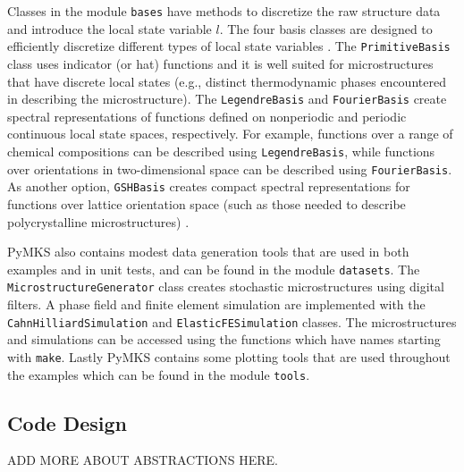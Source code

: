 \documentclass{bmcart}
\begin{document}
Classes in the module \texttt{bases} have methods to discretize the raw structure data and introduce the local state variable $l$. The four basis classes are designed to efficiently discretize different types of local state variables \cite{landi2010multi, kalidindi2010novel, yabansu2014calibrated, al2012multi, kalidindi2011microstructure, gupta2015structure,  cceccen2014data, brough2016microstructure}. The \texttt{PrimitiveBasis} class uses indicator (or hat) functions and it is well suited for microstructures that have discrete local states (e.g., distinct thermodynamic phases encountered in describing the microstructure). The \texttt{LegendreBasis} and \texttt{FourierBasis} create spectral representations of functions defined on nonperiodic and periodic continuous local state spaces, respectively. For example, functions over a range of chemical compositions can be described using \texttt{LegendreBasis}, while functions over orientations in two-dimensional space can be described using \texttt{FourierBasis}. As another option, \texttt{GSHBasis} creates compact spectral representations for functions over lattice orientation space (such as those needed to describe polycrystalline microstructures) \cite{ kalidindi2006spectral, shaffer2010building, knezevic2010deformation, al2010spectral, duvvuru2007application, li2003evolution, li2005texture, li2007processing, li2005processing, creuziger2014crystallographic, sundararaghavan2008multi, sundararaghavan2007linear}.

PyMKS also contains modest data generation tools that are used in both examples and in unit tests, and can be found in the module \texttt{datasets}. The \texttt{MicrostructureGenerator} class creates stochastic microstructures using digital filters. A phase field and finite element simulation are implemented with the \texttt{CahnHilliardSimulation} and \texttt{ElasticFESimulation} classes. The microstructures and simulations can be accessed using the functions which have names starting with \texttt{make}. Lastly PyMKS contains some plotting tools that are used throughout the examples which can be found in the module \texttt{tools}.

\subsection{Code Design}

ADD MORE ABOUT ABSTRACTIONS HERE.
\end{document}
